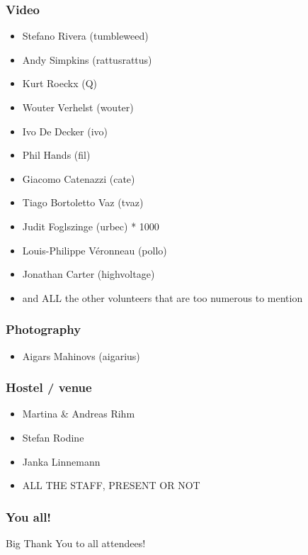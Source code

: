 \documentclass[t]{beamer}
\begin{document}
\begin{frame}
	\frametitle{Video}
	\begin{itemize}
		\item Stefano Rivera (tumbleweed)
		\item Andy Simpkins (rattusrattus)
		\item Kurt Roeckx (Q)
		\item Wouter Verhelst (wouter)
		\item Ivo De Decker (ivo)
		\item Phil Hands (fil)
		\item Giacomo Catenazzi (cate)
		\item Tiago Bortoletto Vaz (tvaz)
		\item Judit Foglszinge (urbec) * 1000
		\item Louis-Philippe Véronneau (pollo)
		\item Jonathan Carter (highvoltage)
		\item and ALL the other volunteers that are too numerous to mention
	\end{itemize}
\end{frame}

\begin{frame}
	\frametitle{Photography}
	\begin{itemize}
		\item Aigars Mahinovs (aigarius)
	\end{itemize}
\end{frame}

\begin{frame}
	\frametitle{Hostel / venue}
	\begin{itemize}
		\item Martina \& Andreas Rihm
		\item Stefan Rodine
		\item Janka Linnemann
		\item ALL THE STAFF, PRESENT OR NOT
	\end{itemize}
\end{frame}

\begin{frame}
	\frametitle{You all!}
	Big Thank You to all attendees!
\end{frame}
\end{document}
